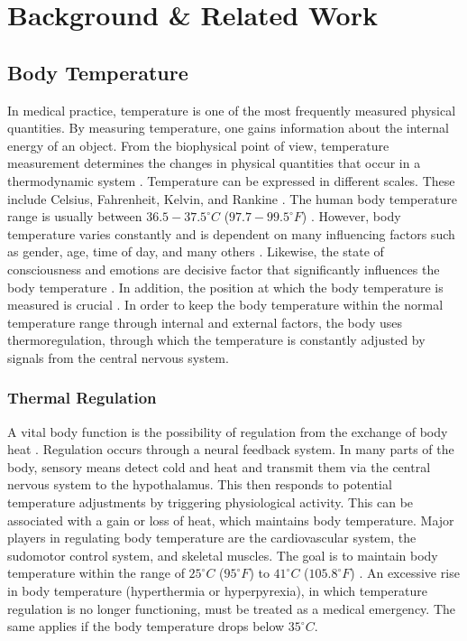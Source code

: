 
\chapter{Background \& Related Work}
\label{ch:Background}

\section{Body Temperature}
\label{Background:BodyTemperature}
In medical practice, temperature is one of the most frequently measured physical quantities.
By measuring temperature, one gains information about the internal energy of an object.
From the biophysical point of view, temperature measurement determines the changes in physical quantities that occur in a thermodynamic system \cite{dolibogComparativeAnalysisHuman2022}.
Temperature can be expressed in different scales.
These include Celsius, Fahrenheit, Kelvin, and Rankine \cite{grodzinskyUnderstandingFeverBody2020}.
The human body temperature range is usually between $36.5-37.5^\circ C$ ($97.7-99.5^\circ F$) \cite{hutchisonHypothermiaTherapyTraumatic2008}.
However, body temperature varies constantly and is dependent on many influencing factors such as gender, age, time of day, and many others \cite{sund-levanderNormalOralRectal2002}.
Likewise, the state of consciousness and emotions are decisive factor that significantly influences the body temperature \cite{barbosaescobarTemperatureEmotions2021}.
In addition, the position at which the body temperature is measured is crucial \cite{Physiologie9783137960072ZVAB}.
In order to keep the body temperature within the normal temperature range through internal and external factors, the body uses thermoregulation, through which the temperature is constantly adjusted by signals from the central nervous system.

\subsection{Thermal Regulation}
\label{Background:BodyTemperature:ThermalRegulation}
A vital body function is the possibility of regulation from the exchange of body heat \cite{grodzinskyUnderstandingFeverBody2020}.
Regulation occurs through a neural feedback system. 
In many parts of the body, sensory means detect cold and heat and transmit them via the central nervous system to the hypothalamus.
This then responds to potential temperature adjustments by triggering physiological activity. 
This can be associated with a gain or loss of heat, which maintains body temperature.
Major players in regulating body temperature are the cardiovascular system, the sudomotor control system, and skeletal muscles. 
The goal is to maintain body temperature within the range of $25^\circ C$ ($95^\circ F$) to $41^\circ C$ ($105.8^\circ F$) \cite{pierauTemperatursensibilitaet2001}. 
An excessive rise in body temperature (hyperthermia or hyperpyrexia), in which temperature regulation is no longer functioning, must be treated as a medical emergency.
The same applies if the body temperature drops below $35^\circ C$.

